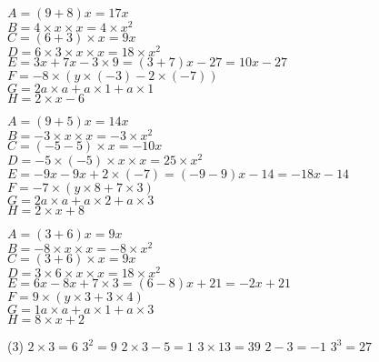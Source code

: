\documentclass[a4paper,11pt,fleqn]{article}
\begin{document}
\begin{correction}
\begin{multicols}{2}

\begin{multicols}{2}
$A=(9  +8) x=17 x$\\
$B=4 \times x\times x=4 \times x^2$\\
$C=(6 +3) \times x=9  x$\\
$D=6\times 3\times x\times x=18\times x^2$\\
$E= 3  x +7 x -3\times 9 = (3  +7) x -27 = 10 x -27 $\\
$F=-8 \times (y\times (-3) -2 \times (-7))$\\
$G=2 a\times  a+a\times 1+a\times 1$\\
$H= 2\times x -6$
\end{multicols}


\begin{multicols}{2}
$A=(9  +5) x=14 x$\\
$B=-3 \times x\times x=-3 \times x^2$\\
$C=(-5 -5) \times x=-10  x$\\
$D=-5\times (-5)\times x\times x=25\times x^2$\\
$E= -9  x -9 x +2\times (-7) = (-9  -9) x -14 = -18 x -14 $\\
$F=-7 \times (y\times 8 +7 \times 3)$\\
$G=2 a\times  a+a\times 2+a\times 3$\\
$H= 2\times x +8$
\end{multicols}


\begin{multicols}{2}
$A=(3  +6) x=9 x$\\
$B=-8 \times x\times x=-8 \times x^2$\\
$C=(3 +6) \times x=9  x$\\
$D=3\times 6\times x\times x=18\times x^2$\\
$E= 6  x -8 x +7\times 3 = (6  -8) x +21 = -2 x +21 $\\
$F=9 \times (y\times 3 +3 \times 4)$\\
$G=1 a\times  a+a\times 1+a\times 3$\\
$H= 8\times x +2$
\end{multicols}
\exo{}


\begin{tasks}[counter-format = {tsk[1].},label-format={\bfseries}](3)
	\task $2\times3=6$ 
	\task $3^2=9$
	\task $2\times3-5=1$
	\task $3\times13=39$
	\task $2-3=-1$
	\task $3^3=27$
\end{tasks}


\end{multicols}
\end{correction}
\end{document}
